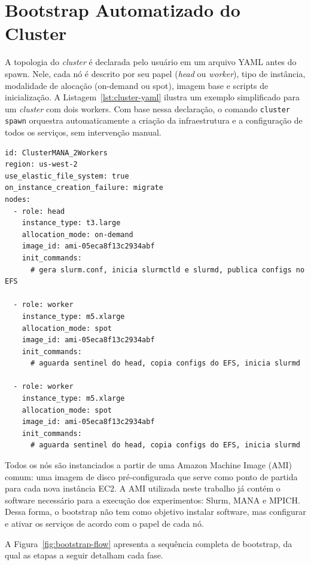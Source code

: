\section{Bootstrap Automatizado do Cluster}
\label{sec:bootstrap}

A topologia do \textit{cluster} é declarada pelo usuário em um arquivo YAML antes do spawn.
Nele, cada nó é descrito por seu papel (\textit{head} ou \textit{worker}), tipo de
instância, modalidade de alocação (on-demand ou spot), imagem base e scripts de
inicialização. A Listagem~\ref{lst:cluster-yaml} ilustra um exemplo simplificado
para um \textit{cluster} com dois workers. Com base nessa declaração, o comando
\texttt{cluster spawn} orquestra automaticamente a criação da infraestrutura e a
configuração de todos os serviços, sem intervenção manual.

\begin{listing}[htb]
  \caption{Declaração de \textit{cluster} com dois \textit{workers} (simplificado).}
  \label{lst:cluster-yaml}
  \begin{verbatim}
id: ClusterMANA_2Workers
region: us-west-2
use_elastic_file_system: true
on_instance_creation_failure: migrate
nodes:
  - role: head
    instance_type: t3.large
    allocation_mode: on-demand
    image_id: ami-05eca8f13c2934abf
    init_commands:
      # gera slurm.conf, inicia slurmctld e slurmd, publica configs no EFS

  - role: worker
    instance_type: m5.xlarge
    allocation_mode: spot
    image_id: ami-05eca8f13c2934abf
    init_commands:
      # aguarda sentinel do head, copia configs do EFS, inicia slurmd

  - role: worker
    instance_type: m5.xlarge
    allocation_mode: spot
    image_id: ami-05eca8f13c2934abf
    init_commands:
      # aguarda sentinel do head, copia configs do EFS, inicia slurmd
  \end{verbatim}
\end{listing}

Todos os nós são instanciados a partir de uma Amazon Machine Image (AMI) comum: uma
imagem de disco pré-configurada que serve como ponto de partida para cada nova
instância EC2. A AMI utilizada neste trabalho já contém o software necessário para a
execução dos experimentos: Slurm, MANA e MPICH. Dessa forma, o
bootstrap não tem como objetivo instalar software, mas configurar e ativar os
serviços de acordo com o papel de cada nó.

A Figura~\ref{fig:bootstrap-flow} apresenta a sequência completa de bootstrap, da qual
as etapas a seguir detalham cada fase.

